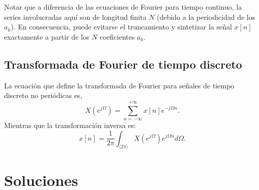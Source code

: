 \documentclass[10pt,a4paper]{article}
\begin{document}
Notar que a diferencia de las ecuaciones de Fourier para tiempo continuo, la series involucradas aquí son de longitud 
finita $N$ (debido a la periodicidad de los $a_k$). En consecuencia, puede evitarse el truncamiento y sintetizar la 
señal $x[n]$ exactamente a partir de los $N$ coeficientes $a_k$.

\subsection*{Transformada de Fourier de tiempo discreto}
La ecuación que define la transformada de Fourier para señales de tiempo discreto no periódicas es,
\begin{equation}
X(e^{j\Omega}) = \sum_{n=-\infty}^{+\infty}x[n]e^{-j\Omega n}.
\end{equation}
Mientras que la transformación inversa es:
\begin{equation}
x[n] = \frac{1}{2\pi} \int_{\langle 2\pi \rangle} X(e^{j\Omega})e^{j\Omega n} d\Omega.
\end{equation}

\section*{Soluciones}
\label{sec:sol}
\end{document}

